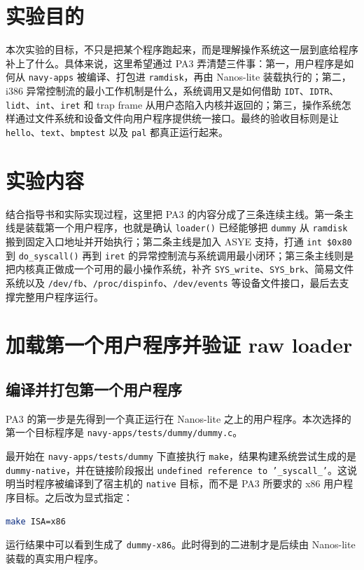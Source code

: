 \documentclass[a4paper]{article}
\begin{document}
\section{实验目的}
本次实验的目标，不只是把某个程序跑起来，而是理解操作系统这一层到底给程序补上了什么。具体来说，这里希望通过 PA3 弄清楚三件事：第一，用户程序是如何从 \texttt{navy-apps} 被编译、打包进 \texttt{ramdisk}，再由 Nanos-lite 装载执行的；第二，i386 异常控制流的最小工作机制是什么，系统调用又是如何借助 \texttt{IDT}、\texttt{IDTR}、\texttt{lidt}、\texttt{int}、\texttt{iret} 和 trap frame 从用户态陷入内核并返回的；第三，操作系统怎样通过文件系统和设备文件向用户程序提供统一接口。最终的验收目标则是让 \texttt{hello}、\texttt{text}、\texttt{bmptest} 以及 \texttt{pal} 都真正运行起来。

\section{实验内容}
结合指导书和实际实现过程，这里把 PA3 的内容分成了三条连续主线。第一条主线是装载第一个用户程序，也就是确认 \texttt{loader()} 已经能够把 \texttt{dummy} 从 \texttt{ramdisk} 搬到固定入口地址并开始执行；第二条主线是加入 ASYE 支持，打通 \texttt{int \$0x80} 到 \texttt{do\_syscall()} 再到 \texttt{iret} 的异常控制流与系统调用最小闭环；第三条主线则是把内核真正做成一个可用的最小操作系统，补齐 \texttt{SYS\_write}、\texttt{SYS\_brk}、简易文件系统以及 \texttt{/dev/fb}、\texttt{/proc/dispinfo}、\texttt{/dev/events} 等设备文件接口，最后去支撑完整用户程序运行。

\section{加载第一个用户程序并验证 raw loader}

\subsection{编译并打包第一个用户程序}
PA3 的第一步是先得到一个真正运行在 Nanos-lite 之上的用户程序。本次选择的第一个目标程序是 \texttt{navy-apps/tests/dummy/dummy.c}。

最开始在 \texttt{navy-apps/tests/dummy} 下直接执行 \texttt{make}，结果构建系统尝试生成的是 \texttt{dummy-native}，并在链接阶段报出 \texttt{undefined reference to '\_syscall\_'}。这说明当时程序被编译到了宿主机的 \texttt{native} 目标，而不是 PA3 所要求的 x86 用户程序目标。之后改为显式指定：
\begin{lstlisting}[language=bash]
make ISA=x86
\end{lstlisting}
运行结果中可以看到生成了 \texttt{dummy-x86}。此时得到的二进制才是后续由 Nanos-lite 装载的真实用户程序。
\end{document}
